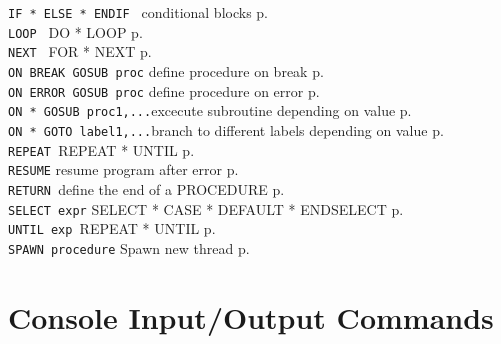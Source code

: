 \begin{tabbing}
{\tt IF * ELSE * ENDIF }\> conditional blocks      \> p.\pageref{IF}\\
{\tt LOOP		}\> DO * LOOP                        \> p.\pageref{LOOP}\\
{\tt NEXT		}\> FOR * NEXT                       \> p.\pageref{NEXT}\\
{\tt ON BREAK GOSUB proc}\> define procedure on break\> p.\pageref{ONbBREAK}\\
{\tt ON ERROR GOSUB proc}\> define procedure on error\> p.\pageref{ONbERROR}\\
{\tt ON * GOSUB proc1,...}\>excecute subroutine depending on value\> p.\pageref{ONb*bGOSUB}\\
{\tt ON * GOTO label1,...}\>branch to different labels depending on value\> p.\pageref{ONb*bGOTO}\\
{\tt REPEAT  		}\>REPEAT * UNTIL\> p.\pageref{REPEAT}\\
{\tt RESUME}             \> resume program after error\> p.\pageref{RESUME}\\
{\tt RETURN  		}\>define the end of a PROCEDURE\> p.\pageref{RETURN}\\
\verb|SELECT expr|      \> SELECT * CASE * DEFAULT * ENDSELECT\> p.\pageref{SELECT}\\
{\tt UNTIL exp		}\>REPEAT * UNTIL\> p.\pageref{UNTIL}\\
\verb|SPAWN procedure|      \> Spawn new thread\> p.\pageref{SPAWN}\\

 \end{tabbing}

\section{Console Input/Output Commands}

